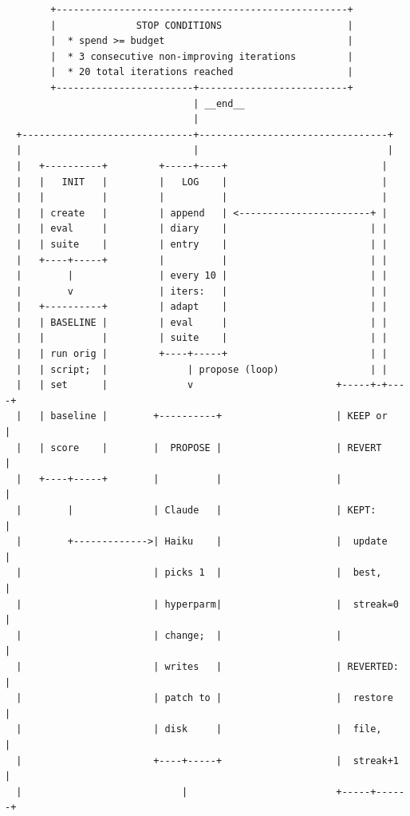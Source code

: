 \documentclass[11pt, letterpaper]{article}
\begin{document}
\begin{verbatim}
        +---------------------------------------------------+
        |              STOP CONDITIONS                      |
        |  * spend >= budget                                |
        |  * 3 consecutive non-improving iterations         |
        |  * 20 total iterations reached                    |
        +------------------------+--------------------------+
                                 | __end__
                                 |
  +------------------------------+---------------------------------+
  |                              |                                 |
  |   +----------+         +-----+----+                           |
  |   |   INIT   |         |   LOG    |                           |
  |   |          |         |          |                           |
  |   | create   |         | append   | <-----------------------+ |
  |   | eval     |         | diary    |                         | |
  |   | suite    |         | entry    |                         | |
  |   +----+-----+         |          |                         | |
  |        |               | every 10 |                         | |
  |        v               | iters:   |                         | |
  |   +----------+         | adapt    |                         | |
  |   | BASELINE |         | eval     |                         | |
  |   |          |         | suite    |                         | |
  |   | run orig |         +----+-----+                         | |
  |   | script;  |              | propose (loop)                | |
  |   | set      |              v                         +-----+-+----+
  |   | baseline |        +----------+                    | KEEP or    |
  |   | score    |        |  PROPOSE |                    | REVERT     |
  |   +----+-----+        |          |                    |            |
  |        |              | Claude   |                    | KEPT:      |
  |        +------------->| Haiku    |                    |  update    |
  |                       | picks 1  |                    |  best,     |
  |                       | hyperparm|                    |  streak=0  |
  |                       | change;  |                    |            |
  |                       | writes   |                    | REVERTED:  |
  |                       | patch to |                    |  restore   |
  |                       | disk     |                    |  file,     |
  |                       +----+-----+                    |  streak+1  |
  |                            |                          +-----+------+

\end{verbatim}
\end{document}
